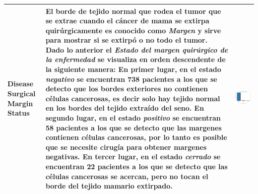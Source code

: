 \begin{table}[!htb]
	\footnotesize
	\begin{threeparttable}
		\begin{tabular}{p{2.5cm} p{7cm} p{6.5cm}} \toprule
			Disease Surgical Margin Status
			& El borde de tejido normal que rodea el tumor que se extrae cuando el cáncer de mama se extirpa quirúrgicamente es conocido como \textit{Margen} y sirve para mostrar si se extirpó o no todo el tumor\cite{Susan}. Dado lo anterior el \textit{Estado del margen quirúrgico de la enfermedad} se visualiza en orden descendente de la siguiente manera: En primer lugar, en el estado \textit{negativo} se encuentran 738 pacientes a los que se detecto que los bordes exteriores no contienen células cancerosas, es decir solo hay tejido normal en los bordes del tejido extraído del seno. En segundo lugar, en el estado \textit{positivo} se encuentran 58 pacientes a los que se detecto que las margenes contienen células cancerosas, por lo tanto es posible que se necesite cirugía para obtener margenes negativas. En tercer lugar, en el estado \textit{cerrado} se encuentran 22 pacientes a los que se detecto que las células cancerosas se acercan, pero no tocan el borde del tejido mamario extirpado.
			
			& \begin{center}\includegraphics[width=1\linewidth]{NOTEBOOK/IMAGENES_DESCRIPTIVAS/41_disease_surgical_margin_status}\end{center}
			\\ \hline
			

\end{tabular}
\end{threeparttable}
\end{table}
